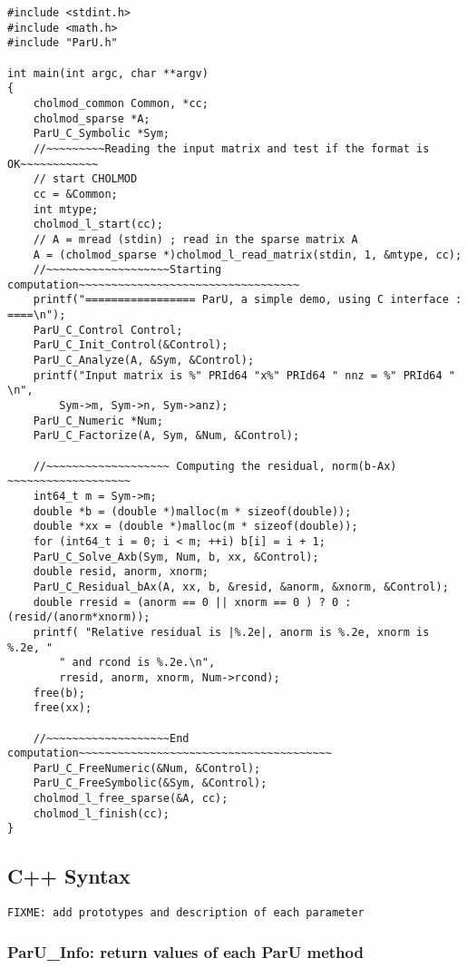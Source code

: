 \documentclass[12pt]{article}
\begin{document}
\begin{verbatim}
#include <stdint.h>
#include <math.h>
#include "ParU.h"

int main(int argc, char **argv)
{
    cholmod_common Common, *cc;
    cholmod_sparse *A;
    ParU_C_Symbolic *Sym;
    //~~~~~~~~~Reading the input matrix and test if the format is OK~~~~~~~~~~~~
    // start CHOLMOD
    cc = &Common;
    int mtype;
    cholmod_l_start(cc);
    // A = mread (stdin) ; read in the sparse matrix A
    A = (cholmod_sparse *)cholmod_l_read_matrix(stdin, 1, &mtype, cc);
    //~~~~~~~~~~~~~~~~~~~Starting computation~~~~~~~~~~~~~~~~~~~~~~~~~~~~~~~~~~
    printf("================= ParU, a simple demo, using C interface : ====\n");
    ParU_C_Control Control;
    ParU_C_Init_Control(&Control);
    ParU_C_Analyze(A, &Sym, &Control);
    printf("Input matrix is %" PRId64 "x%" PRId64 " nnz = %" PRId64 " \n",
        Sym->m, Sym->n, Sym->anz);
    ParU_C_Numeric *Num;
    ParU_C_Factorize(A, Sym, &Num, &Control);

    //~~~~~~~~~~~~~~~~~~~ Computing the residual, norm(b-Ax) ~~~~~~~~~~~~~~~~~~~
    int64_t m = Sym->m;
    double *b = (double *)malloc(m * sizeof(double));
    double *xx = (double *)malloc(m * sizeof(double));
    for (int64_t i = 0; i < m; ++i) b[i] = i + 1;
    ParU_C_Solve_Axb(Sym, Num, b, xx, &Control);
    double resid, anorm, xnorm;
    ParU_C_Residual_bAx(A, xx, b, &resid, &anorm, &xnorm, &Control);
    double rresid = (anorm == 0 || xnorm == 0 ) ? 0 : (resid/(anorm*xnorm));
    printf( "Relative residual is |%.2e|, anorm is %.2e, xnorm is %.2e, "
        " and rcond is %.2e.\n",
        rresid, anorm, xnorm, Num->rcond);
    free(b);
    free(xx);

    //~~~~~~~~~~~~~~~~~~~End computation~~~~~~~~~~~~~~~~~~~~~~~~~~~~~~~~~~~~~~~
    ParU_C_FreeNumeric(&Num, &Control);
    ParU_C_FreeSymbolic(&Sym, &Control);
    cholmod_l_free_sparse(&A, cc);
    cholmod_l_finish(cc);
}
\end{verbatim}

\subsection{C++ Syntax}

\verb'FIXME: add prototypes and description of each parameter' %

\subsubsection{{\sf ParU\_Info}: return values of each ParU method}
\end{document}
